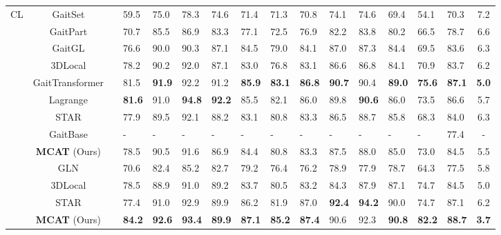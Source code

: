 \documentclass[journal]{IEEEtran}
\begin{document}
\begin{table*}[t]
\begin{center}
\begin{tabular}{|c|c|c| l l l l l l l l l l l|l|c|}
\multirow{7}{*}{CL} & GaitSet \cite{chao2021gaitset} &  & 59.5 & 75.0 & 78.3 & 74.6 & 71.4 & 71.3 & 70.8 & 74.1 & 74.6 & 69.4 & 54.1 & 70.3 & 7.2 \\
& GaitPart \cite{fan2020gaitpart} &  & 70.7 &85.5 &86.9 &83.3 &77.1 &72.5 &76.9 &82.2 &83.8 &80.2 &66.5 &78.7 &6.6 \\
& GaitGL \cite{GaitGL} &  & 76.6 & 90.0 & 90.3 & 87.1 & 84.5 & 79.0 & 84.1 & 87.0 & 87.3 & 84.4 & 69.5 & 83.6 & 6.3 \\
& 3DLocal \cite{local3D} &  & 78.2 & 90.2 & 92.0 & 87.1 & 83.0 & 76.8 & 83.1 & 86.6 & 86.8 & 84.1 & 70.9 & 83.7 & 6.2 \\
& GaitTransformer \cite{cui2022gaittransformer} &  & 81.5 & \textbf{91.9} & 92.2 & 91.2 & \textbf{85.9} & \textbf{83.1} & \textbf{86.8} & \textbf{90.7} & 90.4 & \textbf{89.0} & \textbf{75.6} & \textbf{87.1} & \textbf{5.0} \\
& Lagrange \cite{chai2022lagrange} &  & \textbf{81.6} & 91.0 & \textbf{94.8} & \textbf{92.2} & 85.5 & 82.1 & 86.0 & 89.8 & \textbf{90.6} & 86.0 & 73.5 & 86.6 & 5.7 \\
& STAR \cite{huang2022star} &  & 77.9 & 89.5 & 92.1 & 88.2 & 83.1 & 80.8 & 83.3 & 86.5 & 88.7 & 85.8 & 68.3 & 84.0 & 6.3 \\
& GaitBase \cite{fan2023opengait} &  & - & - & - & - & - & - & - & - & - & - & - & 77.4 & - \\
& \textbf{MCAT} (Ours) &  & 78.5 & 90.5 & 91.6 & 86.9 & 84.4 & 80.8 & 83.3 & 87.5 & 88.0 & 85.0 & 73.0 & 84.5 & 5.5 \\\cline{2-16}

& GLN \cite{hou2020gait} &  & 70.6 & 82.4 & 85.2 & 82.7 & 79.2 & 76.4 & 76.2 & 78.9 & 77.9 & 78.7 & 64.3 & 77.5 & 5.8 \\
& 3DLocal \cite{local3D} &  & 78.5 & 88.9 & 91.0 & 89.2 & 83.7 & 80.5 & 83.2 & 84.3 & 87.9 & 87.1 & 74.7 & 84.5 & 5.0 \\
& STAR \cite{huang2022star} &  & 77.4 & 91.0 & 92.9 & 89.9 & 86.2 & 81.9 & 87.0 & \textbf{92.4} & \textbf{94.2} & 90.0 & 74.7 & 87.1 & 6.2 \\
& \textbf{MCAT} (Ours) &  & \textbf{84.2} & \textbf{92.6} & \textbf{93.4} & \textbf{89.9} & \textbf{87.1} & \textbf{85.2} & \textbf{87.4} & 90.6 & 92.3 & \textbf{90.8} & \textbf{82.2} & \textbf{88.7} & \textbf{3.7} \\\hline

\end{tabular}
\label{tab:casia-b}
\end{center}
\end{table*}
\end{document}
